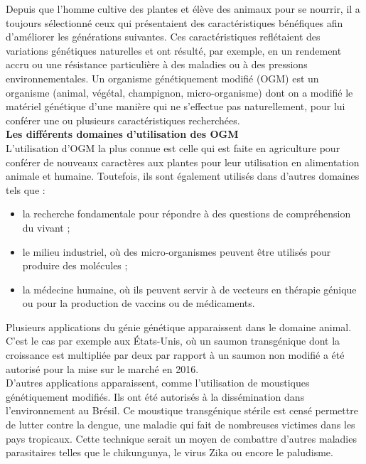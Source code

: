 \documentclass[8pt]{article}
\begin{document}
Depuis que l’homme cultive des plantes et élève des animaux pour se nourrir, il a toujours sélectionné ceux qui présentaient des caractéristiques bénéfiques afin d’améliorer les générations suivantes. Ces caractéristiques reflétaient des variations génétiques naturelles et ont résulté, par exemple, en un rendement accru ou une résistance particulière à des maladies ou à des pressions environnementales. Un organisme génétiquement modifié (OGM) est un organisme (animal, végétal, champignon, micro-organisme) dont on a modifié le matériel génétique d’une manière qui ne s’effectue pas naturellement, pour lui conférer une ou plusieurs caractéristiques recherchées. \\

\textbf{Les différents domaines d’utilisation des OGM }\\

L’utilisation d’OGM la plus connue est celle qui est faite en agriculture pour conférer de nouveaux caractères aux plantes pour leur utilisation en alimentation animale et humaine. Toutefois, ils sont également utilisés dans d’autres domaines tels que :
\begin{itemize}
	\item la recherche fondamentale pour répondre à des questions de compréhension du vivant ;
	\item le milieu industriel, où des micro-organismes peuvent être utilisés pour produire des molécules ;
	\item la médecine humaine, où ils peuvent servir à de vecteurs en thérapie génique ou pour la production de vaccins ou de médicaments.
\end{itemize}


Plusieurs applications du génie génétique apparaissent dans le domaine animal. C’est le cas par exemple aux États-Unis, où un saumon transgénique dont la croissance est multipliée par deux par rapport à un saumon non modifié a été autorisé pour la mise sur le marché en 2016.\\

D’autres applications apparaissent, comme l’utilisation de moustiques génétiquement modifiés. Ils ont été autorisés à la dissémination dans l’environnement au Brésil. Ce moustique transgénique stérile est censé permettre de lutter contre la dengue, une maladie qui fait de nombreuses victimes dans les pays tropicaux. Cette technique serait un moyen de combattre d’autres maladies parasitaires telles que le chikungunya, le virus Zika ou encore le paludisme.\\
\end{document}
